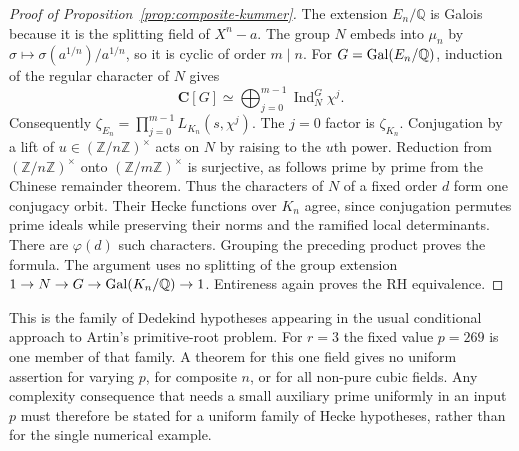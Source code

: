 \documentclass[11pt]{article}
\theoremstyle{remark}\newtheorem{remark}[theorem]{Remark}
\newcommand{\Q}{\mathbb Q}\newcommand{\Z}{\mathbb Z}\newcommand{\C}{\mathbb C}
\begin{document}
\begin{proof}[Proof of Proposition~\ref{prop:composite-kummer}]
The extension $E_n/\Q$ is Galois because it is the splitting field of $X^n-a$. The group $N$ embeds into $\mu_n$ by $\sigma\mapsto\sigma(a^{1/n})/a^{1/n}$, so it is cyclic of order $m\mid n$. For $G=\Gal(E_n/\Q)$, induction of the regular character of $N$ gives
\[
 \mathbf C[G]\simeq\bigoplus_{j=0}^{m-1}\operatorname{Ind}_N^G\chi^j.
\]
Consequently $\zeta_{E_n}=\prod_{j=0}^{m-1}L_{K_n}(s,\chi^j)$. The $j=0$ factor is $\zeta_{K_n}$. Conjugation by a lift of $u\in(\Z/n\Z)^\times$ acts on $N$ by raising to the $u$th power. Reduction from $(\Z/n\Z)^\times$ onto $(\Z/m\Z)^\times$ is surjective, as follows prime by prime from the Chinese remainder theorem. Thus the characters of $N$ of a fixed order $d$ form one conjugacy orbit. Their Hecke functions over $K_n$ agree, since conjugation permutes prime ideals while preserving their norms and the ramified local determinants. There are $\varphi(d)$ such characters. Grouping the preceding product proves the formula. The argument uses no splitting of the group extension $1\to N\to G\to\Gal(K_n/\Q)\to1$. Entireness again proves the RH equivalence.
\end{proof}

This is the family of Dedekind hypotheses appearing in the usual conditional approach to Artin's primitive-root problem. For $r=3$ the fixed value $p=269$ is one member of that family. A theorem for this one field gives no uniform assertion for varying $p$, for composite $n$, or for all non-pure cubic fields. Any complexity consequence that needs a small auxiliary prime uniformly in an input $p$ must therefore be stated for a uniform family of Hecke hypotheses, rather than for the single numerical example.
\end{document}
